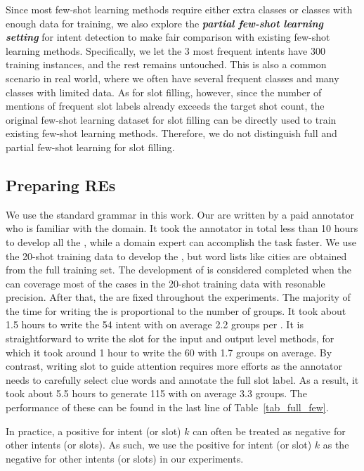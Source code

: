 Since most few-shot learning methods require either extra classes or classes with enough data for training, we also explore the
\textbf{\emph{partial few-shot learning setting}} for intent detection to make fair comparison with existing few-shot learning methods.
Specifically, we let the 3 most frequent intents have 300 training instances, and the rest remains untouched.
This is also a common scenario in real world, where we often have several frequent classes and many classes with limited data.
As for slot filling, however, since the number of mentions of frequent slot labels already exceeds the target shot count,
the original few-shot learning dataset for slot filling can be directly used to train existing few-shot learning methods.
Therefore, we do not distinguish full and partial few-shot learning for slot filling.

\subsection{Preparing REs}
\label{re_in_exp} We use the standard \RE grammar in this work. Our \REs are written by a paid annotator 
who is familiar with the domain.
It took the annotator in total less than 10 hours
to develop all the \REs, while a domain expert can accomplish the task faster. 
We use the 20-shot training data to develop the \REs, but word lists
like cities are obtained from the full training set. 
The development of \REs is considered completed when the \REs can coverage most of the cases in the 20-shot training data with resonable precision.
After that, the \REs are fixed throughout the experiments.
The majority of the time 
for %
writing the \REs is proportional to the number of \RE groups. 
It took about 1.5 hours to write the 54 intent \REs with on average 2.2 groups per \RE. It is straightforward
to write the slot \REs for the input and output level methods, for which it took around
 1 hour to write the 60 \REs with 1.7 groups on average. By contrast, writing slot \REs to guide attention requires more
efforts as the annotator needs to carefully select clue words and annotate the full slot label. As a result, it took about 
5.5 hours to generate 115 \REs with on average 3.3 groups.
The performance of these \REs can be found in the last line of Table~\ref{tab_full_few}.

In practice, a positive \RE for intent (or slot) $k$ can often be treated as negative \REs for other intents (or slots). As such, we use the positive \REs for intent (or slot) $k$ as the negative \REs for other intents (or slots) in our experiments.


